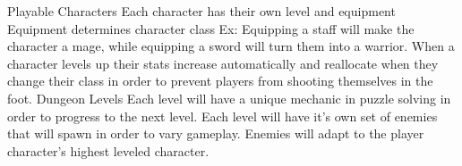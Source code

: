 \documentclass[archE1,portrait]{baposter}
\begin{document}
\begin{poster}
{}


{ 
	\begin{outline}
		\1 Playable Characters
			\2 Each character has their own level and equipment
			\2 Equipment determines character class
				\3 Ex: Equipping a staff will make the character a mage, while equipping a sword will turn them into a warrior.
			\2 When a character levels up their stats increase automatically and reallocate when they change their class in order to prevent players from shooting themselves in the foot.
		\1 Dungeon Levels
			\2 Each level will have a unique mechanic in puzzle solving in order to progress to the next level.
			\2 Each level will have it's own set of enemies that will spawn in order to vary gameplay.
			\2 Enemies will adapt to the player character's highest leveled character.
	\end{outline}
}
\end{poster}
\end{document}
